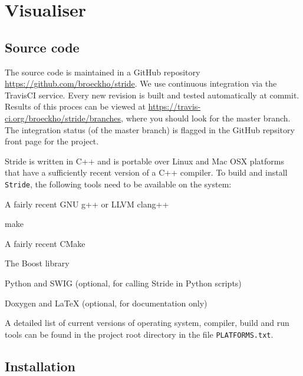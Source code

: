 \chapter{Visualiser}
\label{chap:visualiser}


\section{Source code}
\label{section:source}
The source code is maintained in a GitHub repository \url{https://github.com/broeckho/stride}. We use continuous integration via the TravisCI service. Every new revision is built and tested automatically at commit. Results of this proces can be viewed at \url{https://travis-ci.org/broeckho/stride/branches}, where you should look for the master branch. The integration status (of the master branch) is flagged in the GitHub repsitory front page for the project. 

Stride is written in C++ and is portable over Linux and Mac OSX platforms that have a sufficiently recent version of a C++ compiler. To build and install \texttt{Stride}, the following tools need to be available on the system:
\begin{compactitem}
    \item A fairly recent GNU g++ or LLVM clang++
    \item make
    \item A fairly recent CMake
    \item The Boost library
    \item Python and SWIG (optional, for calling Stride in Python scripts)
    \item Doxygen  and LaTeX (optional, for documentation only)
\end{compactitem}
A detailed list of current versions of operating system, compiler, build and run tools can be found in the project root directory in the file \texttt{PLATFORMS.txt}.

\section{Installation}
\label{section:Installation}

